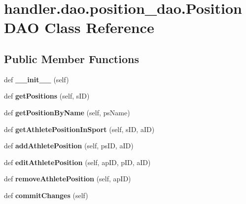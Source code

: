 \hypertarget{classhandler_1_1dao_1_1position__dao_1_1_position_d_a_o}{}\section{handler.\+dao.\+position\+\_\+dao.\+Position\+D\+AO Class Reference}
\label{classhandler_1_1dao_1_1position__dao_1_1_position_d_a_o}
\subsection*{Public Member Functions}
\begin{DoxyCompactItemize}
\item 
\mbox{\label{classhandler_1_1dao_1_1position__dao_1_1_position_d_a_o_a3caf0e4a961dcfcd6032d80d32916ad9}} 
def {\bfseries \+\_\+\+\_\+init\+\_\+\+\_\+} (self)
\item 
\mbox{\label{classhandler_1_1dao_1_1position__dao_1_1_position_d_a_o_a01777e82d441bf074d1c4f9ecd678826}} 
def {\bfseries get\+Positions} (self, s\+ID)
\item 
\mbox{\label{classhandler_1_1dao_1_1position__dao_1_1_position_d_a_o_a303d3f5c3e97c1a6740458c6ec4cc266}} 
def {\bfseries get\+Position\+By\+Name} (self, ps\+Name)
\item 
\mbox{\label{classhandler_1_1dao_1_1position__dao_1_1_position_d_a_o_a89ef7da4ca89d270c3b7db3e1f0a1e33}} 
def {\bfseries get\+Athlete\+Position\+In\+Sport} (self, s\+ID, a\+ID)
\item 
\mbox{\label{classhandler_1_1dao_1_1position__dao_1_1_position_d_a_o_a2d38f2ac8d47a70276f31d67ec4e6fc2}} 
def {\bfseries add\+Athlete\+Position} (self, ps\+ID, a\+ID)
\item 
\mbox{\label{classhandler_1_1dao_1_1position__dao_1_1_position_d_a_o_ab7b26037393505e87a23c77d9c96347a}} 
def {\bfseries edit\+Athlete\+Position} (self, ap\+ID, p\+ID, a\+ID)
\item 
\mbox{\label{classhandler_1_1dao_1_1position__dao_1_1_position_d_a_o_a1916fd729b8b2d2a8921a557d92bc130}} 
def {\bfseries remove\+Athlete\+Position} (self, ap\+ID)
\item 
\mbox{\label{classhandler_1_1dao_1_1position__dao_1_1_position_d_a_o_aee7fb9034b01cda75b25620b48c0005d}} 
def {\bfseries commit\+Changes} (self)
\end{DoxyCompactItemize}
